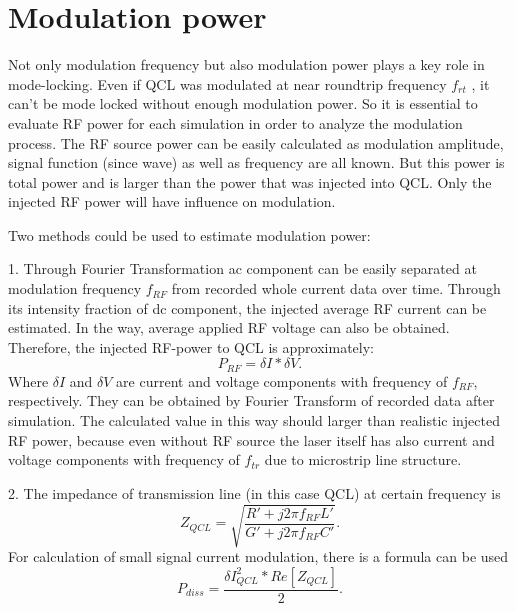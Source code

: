 \documentclass[11pt,final]{scrbook}
\begin{document}
\section{Modulation power}
Not only modulation frequency but also modulation power plays a key role in mode-locking. Even if QCL was modulated at near roundtrip frequency $f_{rt}$ , it can't be mode locked without enough modulation power. So it is essential to evaluate RF power for each simulation in order to analyze the modulation process. The RF source power can be easily calculated as modulation amplitude, signal function (since wave) as well as frequency are all known. But this power is total power and is larger than the power that was injected into QCL. Only the injected RF power will have influence on modulation.

Two methods could be used to estimate modulation power:

1. Through Fourier Transformation ac component can be easily separated at modulation frequency $f_{RF}$ from recorded whole current data over time. Through its intensity fraction of dc component, the injected average RF current can be estimated. In the way, average applied RF voltage can also be obtained. Therefore, the injected RF-power to QCL is approximately:
\begin{equation}
 P_{RF}=\delta I* \delta V.
 \end{equation}
Where $\delta I$ and $ \delta V$ are current and voltage components with frequency of $f_{RF}$, respectively. They can be obtained by Fourier Transform of recorded data after simulation. The calculated value in this way should larger than realistic injected RF power, because even without RF source the laser itself has also current and voltage components with frequency of $f_{tr}$ due to microstrip line structure.

2. The impedance of transmission line (in this case QCL) at certain frequency is 
\begin{equation}
Z_{QCL}=\sqrt{\frac{R'+j2\pi f_{RF}L'}{G'+j2\pi f_{RF}C'}}.
\end{equation}
For calculation of small signal current modulation, there is a formula \cite{ramo2008fields} can be used 
\begin{equation}
{ P }_{ diss }=\frac { \delta { I }_{ QCL }^{ 2 }*Re[{ Z }_{ QCL }] }{ 2 }.
\end{equation}
\end{document}
